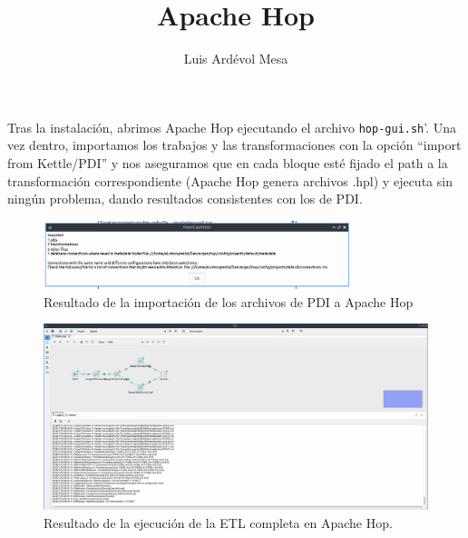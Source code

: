 \documentclass[10pt]{opticajnl}
\title{Apache Hop}
\author[1,2,3]{Luis Ardévol Mesa}
\begin{document}
\maketitle

Tras la instalación, abrimos Apache Hop ejecutando el archivo \texttt{hop-gui.sh}'. Una vez dentro, importamos los trabajos y las transformaciones con la opción ``import from Kettle/PDI'' y nos aseguramos que en cada bloque esté fijado el path a la transformación correspondiente (Apache Hop genera archivos .hpl) y ejecuta sin ningún problema, dando resultados consistentes con los de PDI.

\begin{figure}[H]
\centering
\includegraphics[width=0.8\textwidth]{fotos/import.png}
\caption{Resultado de la importación de los archivos de PDI a Apache Hop}
\end{figure}

\begin{figure}[H]
\centering
\includegraphics[width=\textwidth]{fotos/bien.png}
\caption{Resultado de la ejecución de la ETL completa en Apache Hop.}
\end{figure}
\end{document}
